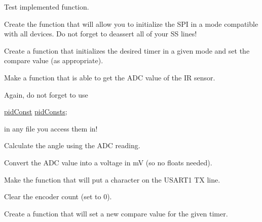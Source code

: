 \begin{DoxyRefList}
Test implemented function.  
\item[\label{todo__todo000024}%
\hypertarget{todo__todo000024}{}%
Global \hyperlink{_s_p_i_8h_a070402cc6c1cae693d10f59f9c483f76}{init\-S\-P\-I} ()]Create the function that will allow you to initialize the S\-P\-I in a mode compatible with all devices. Do not forget to deassert all of your S\-S lines!  
\item[\label{todo__todo000026}%
\hypertarget{todo__todo000026}{}%
Global \hyperlink{timer_8c_a467daa2177a6f16447a9ada6303c849a}{init\-Timer} (int timer, int mode, unsigned int comp)]Create a function that initializes the desired timer in a given mode and set the compare value (as appropriate).  
\item[\label{todo__todo000012}%
\hypertarget{todo__todo000012}{}%
Global \hyperlink{_periph_8h_ae0fb6b592e76f0934db14682e63982df}{I\-R\-Dist} (int chan)]Make a function that is able to get the A\-D\-C value of the I\-R sensor.  
\item[\label{todo__todo000016}%
\hypertarget{todo__todo000016}{}%
Global \hyperlink{_p_i_d_8h_a4d2fc78b5924045bcc0e20fc95e18d97}{pid\-Consts} ]Again, do not forget to use
\begin{DoxyCode}
\hyperlink{structpid_const}{pidConst} \hyperlink{_p_i_d_8h_a4d2fc78b5924045bcc0e20fc95e18d97}{pidConsts}; 
\end{DoxyCode}
 in any file you access them in!  
\item[\label{todo__todo000022}%
\hypertarget{todo__todo000022}{}%
Global \hyperlink{pot_8h_a6572afa21880ee8fe8e834b7167e111b}{pot\-Angle} (int pot)]Calculate the angle using the A\-D\-C reading.  
\item[\label{todo__todo000023}%
\hypertarget{todo__todo000023}{}%
Global \hyperlink{pot_8h_ac8f71572a099805fc4cfcc793260e98b}{pot\-Volts} (int pot)]Convert the A\-D\-C value into a voltage in m\-V (so no floats needed).  
\item[\label{todo__todo000030}%
\hypertarget{todo__todo000030}{}%
Global \hyperlink{_u_s_a_r_t_debug_8c_ab52220b9802762326175f5a6d09c50a1}{put\-Char\-Debug} (char byte\-To\-Send)]Make the function that will put a character on the U\-S\-A\-R\-T1 T\-X line.  
\item[\label{todo__todo000014}%
\hypertarget{todo__todo000014}{}%
Global \hyperlink{_periph_8h_a9b159db17b7ebf680a2bdd169e269f85}{reset\-Enc\-Count} (int chan)]Clear the encoder count (set to 0).  
\item[\label{todo__todo000027}%
\hypertarget{todo__todo000027}{}%
Global \hyperlink{timer_8h_a7641a7bb79d647d59112ed4d20e01aeb}{set\-Comp\-Value} (unsigned char timer, unsigned short int comp)]Create a function that will set a new compare value for the given timer.  

\end{DoxyRefList}
